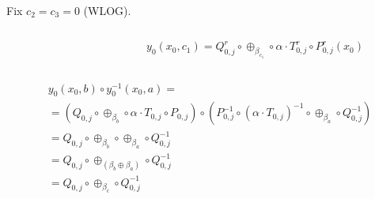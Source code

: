 \documentclass{beamer}
\begin{document}
\begin{frame}
    Fix $c_2 = c_3 = 0$ (WLOG).
    \medskip
     \begin{columns}
     \begin{column}{0.35\textwidth}
 	\centerline{}
     \end{column}
 
     \begin{column}{0.55\textwidth}
 	\begin{equation*}
	y_0\left(x_0, c_1\right) = Q^r_{0,j} \circ \oplus_{\beta_{c_1}} \circ \alpha \cdot T^r_{0,j} \circ P^r_{0,j} \left(x_0\right)
	\end{equation*}
     \end{column}
     \end{columns}

      \begin{subequations}
     \begin{align}
     & y_0\left(x_0, b\right) \circ y_0^{-1}\left(x_0, a\right) = \nonumber \\
     &=           \left( Q_{0,j}      \circ \oplus_{\beta_b}                         \circ \alpha \cdot T_{0,j}    \circ P_{0,j}     \right) \nonumber
	\circ     \left( P^{-1}_{0,j} \circ \left(\alpha \cdot T_{0,j}\right)^{-1}   \circ \oplus_{\beta_a}        \circ Q^{-1}_{0,j}\right) \nonumber \\
     &= Q_{0,j} \circ \oplus_{\beta_b} \circ \oplus_{\beta_a} \circ Q^{-1}_{0,j}                                                             \nonumber \\
     &= Q_{0,j} \circ \oplus_{\left(\beta_b \oplus \beta_a\right)} \circ Q^{-1}_{0,j}                                                        \nonumber \\
     &= Q_{0,j} \circ \oplus_{\beta_c} \circ Q^{-1}_{0,j}										     \nonumber
     \end{align}
    \end{subequations}
\end{frame}
\end{document}

